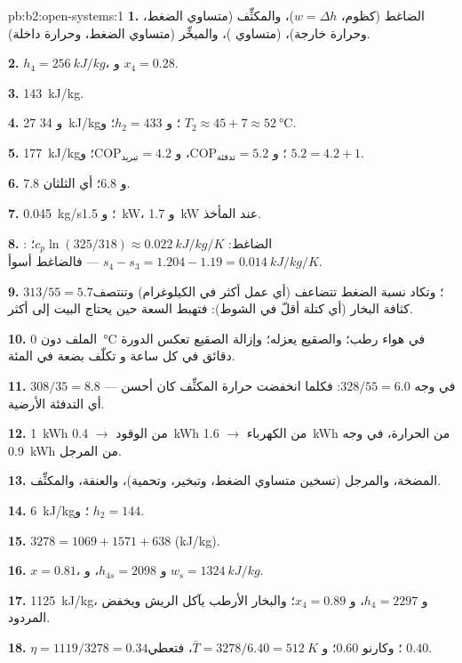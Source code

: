 \begin{solution}{pb:b2:open-systems:1}
\textbf{1.} الضاغط (كظوم، $w = \Delta h$)، والمكثِّف (متساوي الضغط، وحرارة
خارجة)،  (متساوي )، والمبخِّر (متساوي الضغط، وحرارة داخلة).

\textbf{2.} $h_4 = \qty{256}{kJ/kg}$، و $x_4 = 0.28$.

\textbf{3.} \qty{143}{kJ/kg}.

\textbf{4.} \qty{27}{} و \qty{34}{kJ/kg}؛ و $h_2 = 433$؛ و $T_2 \approx 45 + 7 \approx
\qty{52}{\celsius}$.

\textbf{5.} \qty{177}{kJ/kg}؛ و $\mathrm{COP}_{\text{تدفئة}} = 5.2$، و $\mathrm{COP}_{\text{تبريد}} = 4.2$؛
و $5.2 = 4.2 + 1$.

\textbf{6.} $7.8$ و $6.8$؛ أي الثلثان.

\textbf{7.} \qty{0.045}{kg/s}؛ و \qty{1.5}{kW}، و \qty{1.7}{kW} عند المأخذ.

\textbf{8.} الضاغط: $c_p\ln(325/318) \approx \qty{0.022}{kJ/kg/K}$؛
: $s_4 - s_3 = 1.204 - 1.19 = \qty{0.014}{kJ/kg/K}$ --- فالضاغط أسوأ.

\textbf{9.} $313/55 = 5.7$؛ وتكاد نسبة الضغط تتضاعف (أي عمل أكثر
في الكيلوغرام) وتنتصف كثافة البخار (أي كتلة أقلّ في الشوط):
فتهبط السعة حين يحتاج البيت إلى أكثر.

\textbf{10.} الملف دون \qty{0}{\celsius} في هواء رطب؛ والصقيع
يعزله؛ وإزالة الصقيع تعكس الدورة دقائق في كل ساعة و
تكلّف بضعة في المئة.

\textbf{11.} $308/35 = 8.8$ في وجه $328/55 = 6.0$: فكلما انخفضت
حرارة المكثِّف كان أحسن --- أي التدفئة الأرضية.

\textbf{12.} \qty{1}{kWh} من الوقود $\to$ \qty{0.4}{kWh} من الكهرباء $\to$
\qty{1.6}{kWh} من الحرارة، في وجه \qty{0.9}{kWh} من المرجل.

\textbf{13.} المضخة، والمرجل (تسخين متساوي الضغط، وتبخير، وتحمية)،
والعنفة، والمكثِّف.

\textbf{14.} \qty{6}{kJ/kg}؛ و $h_2 = 144$.

\textbf{15.} $3278 = 1069 + 1571 + 638$ (\unit{kJ/kg}).

\textbf{16.} $x = 0.81$، و $h_{4s} = 2098$، و $w_{\text{s}} = \qty{1324}{kJ/kg}$.

\textbf{17.} \qty{1125}{kJ/kg}، و $h_4 = 2297$، و $x_4 = 0.89$؛ والبخار الأرطب يآكل
الريش ويخفض المردود.

\textbf{18.} $\eta = 1119/3278 = 0.34$؛ وكارنو $0.60$؛ و $\bar T = 3278/6.40 =
\qty{512}{K}$، فتعطي $0.40$.


\end{solution}
